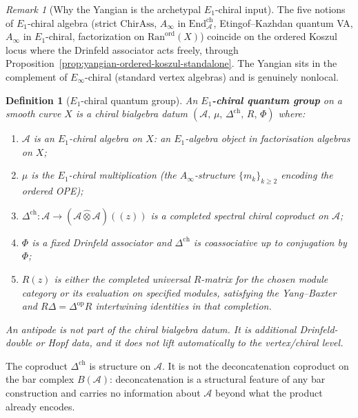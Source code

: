 \documentclass[11pt]{article}
\newtheorem{definition}[theorem]{Definition}
\theoremstyle{remark}
\newtheorem{remark}[theorem]{Remark}
\providecommand{\cA}{\mathcal{A}}
\providecommand{\Ran}{\mathrm{Ran}}
\providecommand{\End}{\mathrm{End}}
\providecommand{\op}{\mathrm{op}}
\providecommand{\Ainf}{A_\infty}
\begin{document}
\begin{remark}[Why the Yangian is the archetypal $E_1$-chiral input]%
\label{rem:yangian-archetypal}%
The five notions of $E_1$-chiral algebra (strict $\mathrm{ChirAss}$,
$A_\infty$ in $\End^{\mathrm{ch}}_\cA$, Etingof--Kazhdan quantum VA,
$A_\infty$ in $E_1$-chiral, factorization on $\Ran^{\mathrm{ord}}(X)$)
coincide on the ordered Koszul locus where the Drinfeld associator
acts freely, through
Proposition~\ref{prop:yangian-ordered-koszul-standalone}. The Yangian
sits in the complement of $E_\infty$-chiral (standard vertex algebras)
and is genuinely nonlocal.
\end{remark}

\begin{definition}[$E_1$-chiral quantum group]%
\label{def:e1-chiral-qg}%
An \textbf{$E_1$-chiral quantum group} on a smooth curve $X$ is a
chiral bialgebra datum
$(\cA,\, \mu,\, \Delta^{\mathrm{ch}},\, R,\, \Phi)$ where:
\begin{enumerate}[label=(\roman*)]
\item $\cA$ is an $E_1$-chiral algebra on $X$: an $E_1$-algebra object in
  factorisation algebras on $X$;
\item $\mu$ is the $E_1$-chiral multiplication (the $\Ainf$-structure
  $\{m_k\}_{k \ge 2}$ encoding the ordered OPE);
\item $\Delta^{\mathrm{ch}} \colon
  \cA \to (\cA \widehat{\otimes}\cA)((z))$ is a completed spectral
  chiral coproduct on $\cA$;
\item $\Phi$ is a fixed Drinfeld associator and
  $\Delta^{\mathrm{ch}}$ is coassociative up to conjugation by~$\Phi$;
\item $R(z)$ is either the completed universal $R$-matrix for the chosen
  module category or its evaluation on specified modules, satisfying the
  Yang--Baxter and $R\Delta=\Delta^{\op}R$ intertwining identities in
  that completion.
\end{enumerate}
An antipode is not part of the chiral bialgebra datum.  It is additional
Drinfeld-double or Hopf data, and it does not lift automatically to the
vertex/chiral level.
\end{definition}

The coproduct $\Delta^{\mathrm{ch}}$ is structure on $\cA$.  It is not the
deconcatenation coproduct on the bar complex $B(\cA)$:
deconcatenation is a structural feature of any bar construction
and carries no information about $\cA$ beyond what the product
already encodes.
\end{document}
